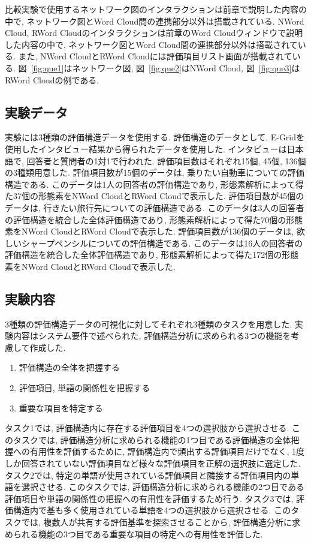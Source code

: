 \documentclass[syuuron]{kuee}
\begin{document}
			比較実験で使用するネットワーク図のインタラクションは前章で説明した内容の中で, 
			ネットワーク図とWord Cloud間の連携部分以外は搭載されている. 
			NWord Cloud, RWord Cloudのインタラクションは前章のWord Cloudウィンドウで説明した内容の中で, 
			ネットワーク図とWord Cloud間の連携部分以外は搭載されている. 
			また, NWord CloudとRWord Cloudには評価項目リスト画面が搭載されている. 
			図~\ref{fig:que1}はネットワーク図, 図~\ref{fig:que2}はNWord Cloud, 
			図~\ref{fig:que3}はRWord Cloudの例である. 
			
		\subsection{実験データ}
			実験には3種類の評価構造データを使用する. 
			評価構造のデータとして, E-Gridを使用したインタビュー結果から得られたデータを使用した.
			インタビューは日本語で, 回答者と質問者の1対1で行われた. 
			評価項目数はそれぞれ15個, 45個, 136個の3種類用意した. 
			評価項目数が15個のデータは, 乗りたい自動車についての評価構造である. 
			このデータは1人の回答者の評価構造であり, 形態素解析によって得た37個の形態素をNWord CloudとRWord Cloudで表示した. 
			評価項目数が45個のデータは, 行きたい旅行先についての評価構造である. 
			このデータは3人の回答者の評価構造を統合した全体評価構造であり, 形態素解析によって得た70個の形態素をNWord CloudとRWord Cloudで表示した. 
			評価項目数が136個のデータは, 欲しいシャープペンシルについての評価構造である. 
			このデータは16人の回答者の評価構造を統合した全体評価構造であり, 形態素解析によって得た172個の形態素をNWord CloudとRWord Cloudで表示した. 
		
		\subsection{実験内容}
			3種類の評価構造データの可視化に対してそれぞれ3種類のタスクを用意した. 
			実験内容はシステム要件で述べられた, 評価構造分析に求められる3つの機能を考慮して作成した. 
			\begin{enumerate}
				\item 評価構造の全体を把握する
				\item 評価項目, 単語の関係性を把握する
				\item 重要な項目を特定する
			\end{enumerate}

			タスク1では, 評価構造内に存在する評価項目を4つの選択肢から選択させる. 
			このタスクでは, 評価構造分析に求められる機能の1つ目である評価構造の全体把握への有用性を評価するために, 
			評価構造内で頻出する評価項目だけでなく, 1度しか回答されていない評価項目など様々な評価項目を正解の選択肢に選定した. 
			タスク2では, 特定の単語が使用されている評価項目と隣接する評価項目内の単語を選択させる. 
			このタスクでは, 評価構造分析に求められる機能の2つ目である評価項目や単語の関係性の把握への有用性を評価するため行う. 
			タスク3では, 評価構造内で基も多く使用されている単語を4つの選択肢から選択させる. 
			このタスクでは, 複数人が共有する評価基準を探索させることから, 評価構造分析に求められる機能の3つ目である重要な項目の特定への有用性を評価した. 
			
\end{document}

